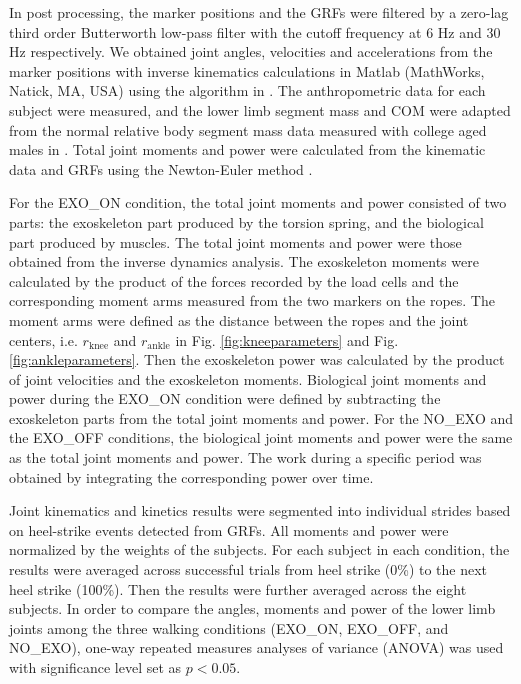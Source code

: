 \documentclass[twocolumn,cleanfoot,10pt]{asme2ej}
\begin{document}
In post processing, the marker positions and the GRFs were filtered by a zero-lag third order Butterworth low-pass filter with the cutoff frequency at 6 Hz and 30 Hz respectively.
We obtained joint angles, velocities and accelerations from the marker positions with inverse kinematics calculations in Matlab (MathWorks, Natick, MA, USA) using the algorithm in \cite{RN24}.
The anthropometric data for each subject were measured, and the lower limb segment mass and COM were adapted from the normal relative body segment mass data measured with college aged males in \cite{de1996adjustments}.
Total joint moments and power were calculated from the kinematic data and GRFs using the Newton-Euler method \cite{kane1985dynamics}.

For the EXO\_ON condition, the total joint moments and power consisted of two parts: the exoskeleton part produced by the torsion spring, and the biological part produced by muscles.
The total joint moments and power were those obtained from the inverse dynamics analysis.
The exoskeleton moments were calculated by the product of the forces recorded by the load cells and the corresponding moment arms measured from the two markers on the ropes.
The moment arms were defined as the distance between the ropes and the joint centers, i.e. $r_\mathrm{knee}$ and $r_\mathrm{ankle}$ in Fig. \ref{fig:kneeparameters} and Fig. \ref{fig:ankleparameters}.
Then the exoskeleton power was calculated by the product of joint velocities and the exoskeleton moments.
Biological joint moments and power during the EXO\_ON condition were defined by subtracting the exoskeleton parts from the total joint moments and power.
For the NO\_EXO and the EXO\_OFF conditions, the biological joint moments and power were the same as the total joint moments and power.
The work during a specific period was obtained by integrating the corresponding power over time.

Joint kinematics and kinetics results were segmented into individual strides based on heel-strike events detected from GRFs.
All moments and power were normalized by the weights of the subjects.
For each subject in each condition, the results were averaged across successful trials from heel strike (0\%) to the next heel strike (100\%).
Then the results were further averaged across the eight subjects.
In order to compare the angles, moments and power of the lower limb joints among the three walking conditions (EXO\_ON, EXO\_OFF, and NO\_EXO), one-way repeated measures analyses of variance (ANOVA) was used with significance level set as $p<0.05$.
\end{document}
